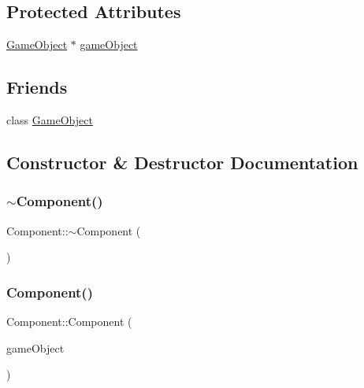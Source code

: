 \subsection*{Protected Attributes}
\begin{DoxyCompactItemize}
\item 
\hyperlink{class_mason_1_1_game_object}{Game\+Object} $\ast$ \hyperlink{class_mason_1_1_component_a30030370c35f5562cbbbb0927b0448c8}{game\+Object}
\end{DoxyCompactItemize}
\subsection*{Friends}
\begin{DoxyCompactItemize}
\item 
class \hyperlink{class_mason_1_1_component_a00df87c957d8f7ee0fc51f07a0542f4a}{Game\+Object}
\end{DoxyCompactItemize}


\subsection{Constructor \& Destructor Documentation}
\hypertarget{class_mason_1_1_component_ab8378fa275af98e568a7e91d33d867af}{}\label{class_mason_1_1_component_ab8378fa275af98e568a7e91d33d867af} 
\subsubsection{\texorpdfstring{$\sim$\+Component()}{~Component()}}
{\footnotesize\ttfamily Component\+::$\sim$\+Component (\begin{DoxyParamCaption}{ }\end{DoxyParamCaption})\hspace{0.3cm}{\ttfamily [virtual]}}

\hypertarget{class_mason_1_1_component_a98d3a7d72f88dc7e67c946c78afb8243}{}\label{class_mason_1_1_component_a98d3a7d72f88dc7e67c946c78afb8243} 
\subsubsection{\texorpdfstring{Component()}{Component()}}
{\footnotesize\ttfamily Component\+::\+Component (\begin{DoxyParamCaption}\item[{\hyperlink{class_mason_1_1_game_object}{Game\+Object} $\ast$}]{game\+Object }\end{DoxyParamCaption})\hspace{0.3cm}{\ttfamily [protected]}}



